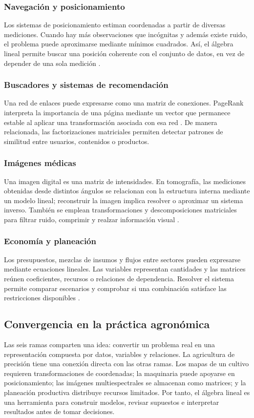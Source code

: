 \documentclass[spanish,letterpaper,oneside]{article}
\begin{document}
\subsubsection{Navegación y posicionamiento}
Los sistemas de posicionamiento estiman coordenadas a partir de diversas mediciones. Cuando hay más observaciones que incógnitas y además existe ruido, el problema puede aproximarse mediante mínimos cuadrados. Así, el álgebra lineal permite buscar una posición coherente con el conjunto de datos, en vez de depender de una sola medición \citep{strang2023introduction}.

\subsubsection{Buscadores y sistemas de recomendación}
Una red de enlaces puede expresarse como una matriz de conexiones. PageRank interpreta la importancia de una página mediante un vector que permanece estable al aplicar una transformación asociada con esa red \citep{page1999pagerank}. De manera relacionada, las factorizaciones matriciales permiten detectar patrones de similitud entre usuarios, contenidos o productos.

\subsubsection{Imágenes médicas}
Una imagen digital es una matriz de intensidades. En tomografía, las mediciones obtenidas desde distintos ángulos se relacionan con la estructura interna mediante un modelo lineal; reconstruir la imagen implica resolver o aproximar un sistema inverso. También se emplean transformaciones y descomposiciones matriciales para filtrar ruido, comprimir y realzar información visual \citep{gonzalez2018digital,meyer2000matrix}.

\subsubsection{Economía y planeación}
Los presupuestos, mezclas de insumos y flujos entre sectores pueden expresarse mediante ecuaciones lineales. Las variables representan cantidades y las matrices reúnen coeficientes, recursos o relaciones de dependencia. Resolver el sistema permite comparar escenarios y comprobar si una combinación satisface las restricciones disponibles \citep{lay2021linear}.

\subsection{Convergencia en la práctica agronómica}
Las seis ramas comparten una idea: convertir un problema real en una representación compuesta por datos, variables y relaciones. La agricultura de precisión tiene una conexión directa con las otras ramas. Los mapas de un cultivo requieren transformaciones de coordenadas; la maquinaria puede apoyarse en posicionamiento; las imágenes multiespectrales se almacenan como matrices; y la planeación productiva distribuye recursos limitados. Por tanto, el álgebra lineal es una herramienta para construir modelos, revisar supuestos e interpretar resultados antes de tomar decisiones.
\end{document}
